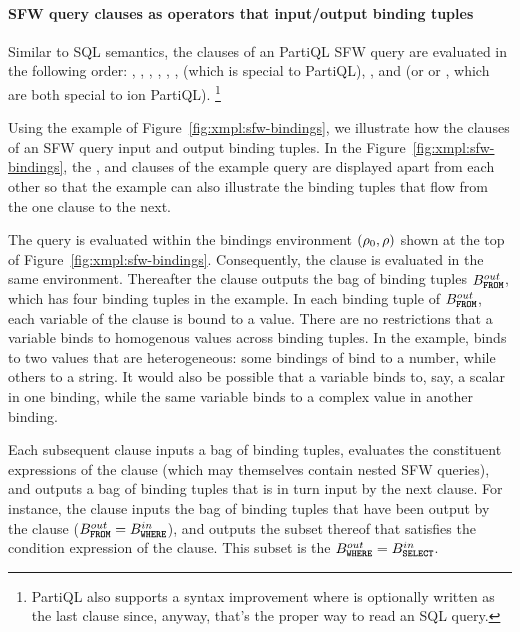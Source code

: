 \paragraph{SFW query clauses as operators that input/output binding tuples}
Similar to SQL semantics, the clauses of an PartiQL SFW query are evaluated in
the following order: , , , , ,
,  (which is special to PartiQL), ,
 and  (or  or , which
are both special to ion PartiQL).
\footnote{PartiQL also supports a syntax improvement where 
is optionally written as the last clause since, anyway, that's the proper
way to read an SQL query.}



Using the example of Figure~\ref{fig:xmpl:sfw-bindings}, we illustrate how the
clauses of an SFW query input and output binding tuples. In the
Figure~\ref{fig:xmpl:sfw-bindings}, the ,  and 
clauses of the example query are displayed apart from each other so that the
example can also illustrate the binding tuples that flow from the one clause to
the next. 

The query is evaluated within the bindings environment $(\rho_{0}, \rho)$ shown at the top
of Figure~\ref{fig:xmpl:sfw-bindings}. Consequently, the  clause is
evaluated in the same environment. Thereafter the  clause outputs the
bag of binding tuples $B^{out}_{\texttt{\textbf{FROM}}}$, which has four binding tuples in
the example. In each binding tuple of $B^{out}_{\texttt{\textbf{FROM}}}$, each variable of
the  clause is bound to a value. There are no restrictions that a
variable binds to homogenous values across binding tuples. In the example,
 binds to two values that are heterogeneous: some bindings of  bind
to a number, while others to a string. It would also be possible that a variable
binds to, say, a scalar in one binding, while the same variable binds to a
complex value in another binding.

Each subsequent clause inputs a bag of binding tuples, evaluates the constituent
expressions of the clause (which may themselves contain nested SFW queries), and
outputs a bag of binding tuples that is in turn input by the next clause. For
instance, the  clause inputs the bag of binding tuples that have been
output by the  clause ($B^{out}_{\texttt{\textbf{FROM}}} = B^{in}_{\texttt{\textbf{WHERE}}}$),
and outputs the subset thereof that satisfies the condition expression of the
 clause. This subset is the $B^{out}_{\texttt{\textbf{WHERE}}} =
B^{in}_{\texttt{\textbf{SELECT}}}$. 

